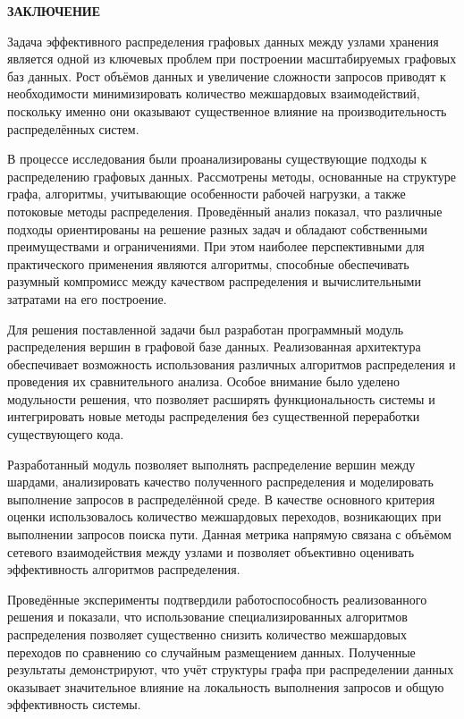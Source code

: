 \begin{center}
    \textbf{ЗАКЛЮЧЕНИЕ}
        \vspace{-12pt}
\end{center}

Задача эффективного распределения графовых данных между узлами хранения является одной из ключевых проблем при построении масштабируемых графовых баз данных. Рост объёмов данных и увеличение сложности запросов приводят к необходимости минимизировать количество межшардовых взаимодействий, поскольку именно они оказывают существенное влияние на производительность распределённых систем.

В процессе исследования были проанализированы существующие подходы к распределению графовых данных. Рассмотрены методы, основанные на структуре графа, алгоритмы, учитывающие особенности рабочей нагрузки, а также потоковые методы распределения. Проведённый анализ показал, что различные подходы ориентированы на решение разных задач и обладают собственными преимуществами и ограничениями. При этом наиболее перспективными для практического применения являются алгоритмы, способные обеспечивать разумный компромисс между качеством распределения и вычислительными затратами на его построение.

Для решения поставленной задачи был разработан программный модуль распределения вершин в графовой базе данных. Реализованная архитектура обеспечивает возможность использования различных алгоритмов распределения и проведения их сравнительного анализа. Особое внимание было уделено модульности решения, что позволяет расширять функциональность системы и интегрировать новые методы распределения без существенной переработки существующего кода.

Разработанный модуль позволяет выполнять распределение вершин между шардами, анализировать качество полученного распределения и моделировать выполнение запросов в распределённой среде. В качестве основного критерия оценки использовалось количество межшардовых переходов, возникающих при выполнении запросов поиска пути. Данная метрика напрямую связана с объёмом сетевого взаимодействия между узлами и позволяет объективно оценивать эффективность алгоритмов распределения.

Проведённые эксперименты подтвердили работоспособность реализованного решения и показали, что использование специализированных алгоритмов распределения позволяет существенно снизить количество межшардовых переходов по сравнению со случайным размещением данных. Полученные результаты демонстрируют, что учёт структуры графа при распределении данных оказывает значительное влияние на локальность выполнения запросов и общую эффективность системы.

